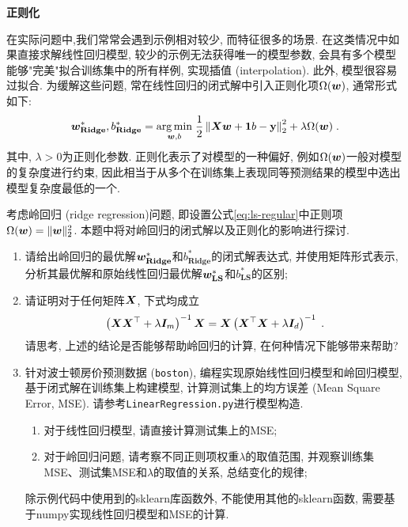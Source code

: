 \documentclass[answers]{exam}  %
\begin{document}
\begin{questions}
  \begin{solution}
  \end{solution}


  \question [25] \textbf{正则化}

  在实际问题中,我们常常会遇到示例相对较少, 而特征很多的场景. 在这类情况中如果直接求解线性回归模型, 较少的示例无法获得唯一的模型参数, 会具有多个模型能够"完美"拟合训练集中的所有样例, 实现插值 (interpolation). 此外, 模型很容易过拟合. 为缓解这些问题, 常在线性回归的闭式解中引入正则化项$\Omega(\boldsymbol{w})$, 通常形式如下:
  \begin{equation}
    \boldsymbol{w}_{\mathbf{Ridge}}^{*}, b_{\mathbf{Ridge}}^{*}=\underset{\boldsymbol{w}, b}{\arg \min }\; \frac{1}{2}\left\|\boldsymbol{X} \boldsymbol{w}+\boldsymbol{1} b-\mathbf{y}\right\|_{2}^{2}+\lambda \Omega(\boldsymbol{w})  \label{eq:ls-regular}\;.
  \end{equation}
  其中, $\lambda > 0$为正则化参数. 正则化表示了对模型的一种偏好, 例如$\Omega(\boldsymbol{w})$一般对模型的复杂度进行约束, 因此相当于从多个在训练集上表现同等预测结果的模型中选出模型复杂度最低的一个.

  考虑岭回归 (ridge regression)问题, 即设置公式\eqref{eq:ls-regular}中正则项$\Omega(\boldsymbol{w}) = \lVert \boldsymbol{w}\rVert_2^2$. 本题中将对岭回归的闭式解以及正则化的影响进行探讨.
  \begin{enumerate}
    \item 请给出岭回归的最优解$\boldsymbol{w}_{\mathbf{Ridge}}^*$和$b_{\mathbf{Ridge}}^*$的闭式解表达式, 并使用矩阵形式表示, 分析其最优解和原始线性回归最优解$\boldsymbol{w}_{\mathbf{LS}}^*$和$b_{\mathbf{LS}}^*$的区别;
    \item 请证明对于任何矩阵$\boldsymbol{X}$, 下式均成立
          \begin{align}
            \left(\boldsymbol{X} \boldsymbol{X}^{\top}+\lambda \boldsymbol{I}_m\right)^{-1} \boldsymbol{X}=\boldsymbol{X}\left(\boldsymbol{X}^{\top} \boldsymbol{X}+\lambda \boldsymbol{I}_d\right)^{-1}\;.
          \end{align}
          请思考, 上述的结论是否能够帮助岭回归的计算, 在何种情况下能够带来帮助?
    \item 针对波士顿房价预测数据 (\lstinline{boston}), 编程实现原始线性回归模型和岭回归模型, 基于闭式解在训练集上构建模型, 计算测试集上的均方误差 (Mean Square Error, MSE). 请参考\lstinline{LinearRegression.py}进行模型构造.
          
          \begin{enumerate}
            \item 对于线性回归模型, 请直接计算测试集上的MSE;
            \item 对于岭回归问题, 请考察不同正则项权重$\lambda$的取值范围, 并观察训练集MSE、测试集MSE和$\lambda$的取值的关系, 总结变化的规律;
          \end{enumerate} 除示例代码中使用到的sklearn库函数外, 不能使用其他的sklearn函数, 需要基于numpy实现线性回归模型和MSE的计算.
  \end{enumerate}
  \begin{solution}
  \end{solution}


\end{questions}
\end{document}
